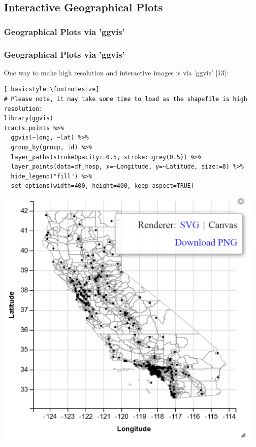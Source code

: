 \subsection{Interactive Geographical Plots}
\subsubsection{Geographical Plots via 'ggvis'}
\begin{frame}
	\frametitle{Geographical Plots via 'ggvis'}
One way to make high resolution and interactive images is via 'ggvis' [13]:

\begin{lstlisting}[ basicstyle=\footnotesize]
# Please note, it may take some time to load as the shapefile is high resolution:
library(ggvis)
tracts.points %>%
  ggvis(~long, ~lat) %>%
  group_by(group, id) %>%
  layer_paths(strokeOpacity:=0.5, stroke:=grey(0.5)) %>%
  layer_points(data=df_hosp, x=~Longitude, y=~Latitude, size:=8) %>%
  hide_legend("fill") %>%
  set_options(width=400, height=400, keep_aspect=TRUE)
\end{lstlisting}

\newpage
       \begin{center}
		\includegraphics[scale=0.6]{images/shapefile_v2.png}
	\end{center}


\end{frame}
